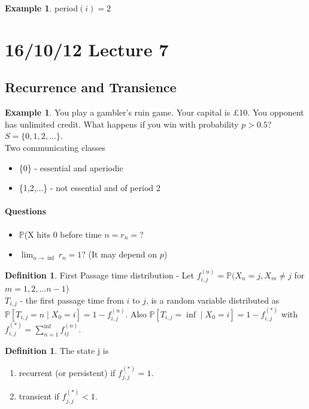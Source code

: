 \documentclass{article}
\theoremstyle{definition}
\newtheorem{defn}[thm]{Definition}
\newtheorem{ex}[thm]{Example}
\newcommand{\PP}{\mathbb{P}}
\begin{document}
\begin{ex}
period$(i) = 2$
\end{ex}

\section{16/10/12 Lecture 7}

\subsection*{Recurrence and Transience}

\begin{ex} You play a gambler's ruin game. Your capital is \pounds 10. You opponent has unlimited credit. What happens if you win with probability $p > 0.5$? $S = \{0, 1, 2, \ldots\}$.\\

Two communicating classes
\begin{itemize}
\item
\{0\} - essential and aperiodic
\item
\{1,2,$\ldots$\} - not essential and of period 2
\end{itemize}
\end{ex}

\paragraph*{Questions}
\begin{itemize}
\item
$\PP$(X hits 0 before time $n = r_n = $?
\item
$\lim_{n \rightarrow \inf} r_n = 1$? (It may depend on $p$)
\end{itemize}

\begin{defn}
First Passage time distribution - Let $f_{i,j}^{(n)} = \PP(X_n = j, X_m \neq j$ for $m = 1, 2, \ldots n-1$)\\

$T_{i,j}$ - the first passage time from $i$ to $j$, is a random variable distributed as $\PP[T_{i,j} = n \mid X_0 = i ] = 1 - f_{i,j}^{(n)}$. Also $\PP[T_{i,j} = \inf \mid X_0 = i] = 1 - f_{i,j}^{(\ast)}$ with $f_{i,j}^{(\ast)} = \sum_{n=1}^{\inf} f_{ij}^{(n)}$. 
\end{defn}

\begin{defn}
The state j is
\begin{enumerate}
\item
recurrent (or persistent) if $f_{j,j}^{(\ast)} = 1$.
\item
transient if $f_{j,j}^{(\ast)} < 1$.
\end{enumerate}
\end{defn}
\end{document}
